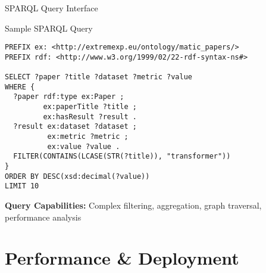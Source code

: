 \documentclass[aspectratio=169]{beamer}
\begin{document}
\begin{frame}[fragile]{SPARQL Query Interface}
    \begin{block}{Sample SPARQL Query}
        \begin{lstlisting}[language=sparql]
PREFIX ex: <http://extremexp.eu/ontology/matic_papers/>
PREFIX rdf: <http://www.w3.org/1999/02/22-rdf-syntax-ns#>

SELECT ?paper ?title ?dataset ?metric ?value
WHERE {
  ?paper rdf:type ex:Paper ;
         ex:paperTitle ?title ;
         ex:hasResult ?result .
  ?result ex:dataset ?dataset ;
          ex:metric ?metric ;
          ex:value ?value .
  FILTER(CONTAINS(LCASE(STR(?title)), "transformer"))
}
ORDER BY DESC(xsd:decimal(?value))
LIMIT 10
        \end{lstlisting}
    \end{block}
    
    \textbf{Query Capabilities:} Complex filtering, aggregation, graph traversal, performance analysis
\end{frame}

\section{Performance \& Deployment}
\end{document}
